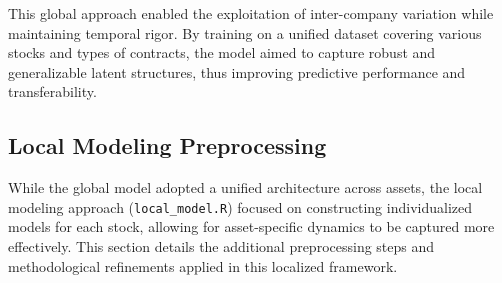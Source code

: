\documentclass[12pt]{report}
\begin{document}
This global approach enabled the exploitation of inter-company variation while maintaining temporal rigor. By training on a unified dataset covering various stocks and types of contracts, the model aimed to capture robust and generalizable latent structures, thus improving predictive performance and transferability.

\subsection{Local Modeling Preprocessing}
While the global model adopted a unified architecture across assets, the local modeling approach (\texttt{local\_model.R}) focused on constructing individualized models for each stock, allowing for asset-specific dynamics to be captured more effectively. This section details the additional preprocessing steps and methodological refinements applied in this localized framework.
\end{document}
